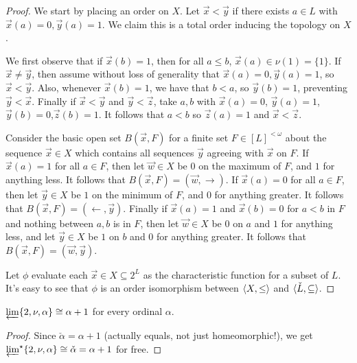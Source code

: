 \documentclass[11pt]{article}
\newcommand{\vect}{\vec}
\begin{document}
  \begin{proof}
    We start by placing an order on \(X\). Let \(\vect x<\vect y\) if
    there exists \(a\in L\) with \(\vect x(a)=0,\vect y(a)=1\). We claim this is
    a total order inducing the topology on \(X\).

    We first observe that if \(\vect x(b)=1\), then for all \(a\leq b\),
    \(\vect x(a)\in\nu(1)=\{1\}\). If \(\vect x\not=\vect y\), then assume
    without loss of generality that \(\vect x(a)=0,\vect y(a)=1\), so
    \(\vect x<\vect y\). Also, whenever \(\vect x(b)=1\), we have that \(b<a\),
    so \(\vect y(b)=1\), preventing \(\vect y<\vect x\). Finally if
    \(\vect x<\vect y\) and \(\vect y<\vect z\), take \(a,b\) with
    \(\vect x(a)=0\), \(\vect y(a)=1\),\(\vect y(b)=0\),\(\vect z(b)=1\). It
    follows that \(a<b\) so \(\vect z(a)=1\) and \(\vect x<\vect z\).

    Consider the basic open set \(B(\vect x,F)\) for a finite set
    \(F\in [L]^{<\omega}\)
    about the sequence \(\vect x\in X\) which contains all sequences
    \(\vect y\) agreeing with \(\vect x\) on \(F\). If \(\vect x(a)=1\) for all
    \(a\in F\), then let \(\vect w\in X\) be \(0\) on the maximum of \(F\),
    and \(1\) for anything less. It follows that
    \(B(\vect x,F)=(\vect w,\rightarrow)\). If \(\vect x(a)=0\) for all
    \(a\in F\), then let \(\vect y\in X\) be \(1\) on the minimum of \(F\),
    and \(0\) for anything greater. It follows that
    \(B(\vect x,F)=(\leftarrow,\vect y)\). Finally if \(\vect x(a)=1\) and
    \(\vect x(b)=0\) for \(a<b\) in \(F\) and nothing between \(a,b\) is in
    \(F\), then let \(\vect w\in X\) be \(0\) on \(a\)
    and \(1\) for anything less, and let \(\vect y\in X\) be \(1\) on \(b\)
    and \(0\) for anything greater. It follows that
    \(B(\vect x,F)=(\vect w,\vect y)\).

    Let \(\phi\) evaluate each \(\vect x\in X\subseteq 2^L\) as the
    characteristic function for a subset of \(L\). It's easy to see that
    \(\phi\) is an order isomorphism between \(\langle X,\leq\rangle\) and
    \(\langle\check L,\subseteq\rangle\).
  \end{proof}

  \begin{corollary}
    \(
      \varprojlim \{2, \nu, \alpha\}
      \cong
      \alpha+1
    \)
    for every ordinal \(\alpha\).
  \end{corollary}

  \begin{proof}
    Since \(\check\alpha=\alpha+1\) (actually equals, not just homeomorphic!),
    we get \(\varprojlim^\star \{2, \nu, \alpha\}
      \cong \check\alpha =
    \alpha+1\) for free.
  \end{proof}
\end{document}
